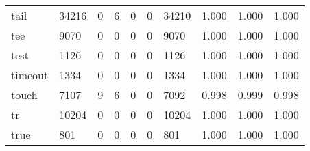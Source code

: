 \begin{longtable}{lp{1.3cm}p{1.3cm}p{1.3cm}p{1.3cm}p{1.3cm}p{1.3cm}p{1.3cm}p{1.3cm}p{1.3cm}}
tail      &                  34216 &                                  0 &                                 6 &                                0 &                                 0 &                           34210 &                                   1.000 &                                  1.000 &                                1.000 \\
tee       &                   9070 &                                  0 &                                 0 &                                0 &                                 0 &                            9070 &                                   1.000 &                                  1.000 &                                1.000 \\
test      &                   1126 &                                  0 &                                 0 &                                0 &                                 0 &                            1126 &                                   1.000 &                                  1.000 &                                1.000 \\
timeout   &                   1334 &                                  0 &                                 0 &                                0 &                                 0 &                            1334 &                                   1.000 &                                  1.000 &                                1.000 \\
touch     &                   7107 &                                  9 &                                 6 &                                0 &                                 0 &                            7092 &                                   0.998 &                                  0.999 &                                0.998 \\
tr        &                  10204 &                                  0 &                                 0 &                                0 &                                 0 &                           10204 &                                   1.000 &                                  1.000 &                                1.000 \\
true      &                    801 &                                  0 &                                 0 &                                0 &                                 0 &                             801 &                                   1.000 &                                  1.000 &                                1.000 \\

\end{longtable}
